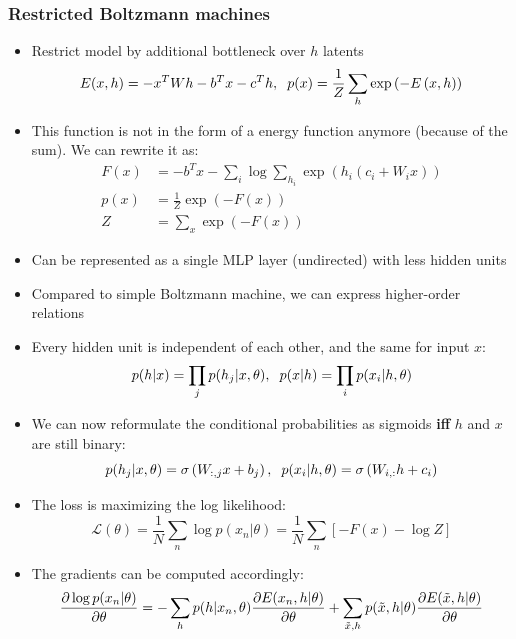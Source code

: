 \subsubsection{Restricted Boltzmann machines}
\begin{itemize}
	\item Restrict model by additional bottleneck over $h$ latents
	$$E(x,h) = -x^T W h - b^T x - c^T h, \hspace{2mm} p(x) = \frac{1}{Z}\sum_h \exp\left(-E\left(x,h\right)\right)$$
	\item This function is not in the form of a energy function anymore (because of the sum). We can rewrite it as:
	\begin{equation*}
		\begin{split}
			F(x) & = -b^T x - \sum_i \log \sum_{h_i} \exp\left(h_i\left(c_i + W_i x\right)\right)\\
			p(x) & = \frac{1}{Z} \exp\left(-F(x)\right)\\
			Z & = \sum\limits_x \exp\left(-F(x)\right)
		\end{split}
	\end{equation*}
	\item Can be represented as a single MLP layer (undirected) with less hidden units
	\item Compared to simple Boltzmann machine, we can express higher-order relations 
	\item Every hidden unit is independent of each other, and the same for input $x$:
	$$p(h|x) = \prod_j p(h_j|x, \theta), \hspace{2mm} p(x|h) = \prod_i p(x_i|h, \theta) $$
	\item We can now reformulate the conditional probabilities as sigmoids \textbf{iff} $h$ and $x$ are still binary:
	$$p(h_j|x, \theta) = \sigma\left(W_{:,j} x + b_j\right), \hspace{2mm}p(x_i|h, \theta) = \sigma\left(W_{i,:} h + c_i\right)$$
	\item The loss is maximizing the log likelihood:
	$$\mathcal{L}(\theta) = \frac{1}{N}\sum_n \log p(x_n|\theta) = \frac{1}{N}\sum_n\left[- F(x) - \log Z\right]$$
	\item The gradients can be computed accordingly:
	\begin{equation*}
		\begin{split}
			\pd{\log p(x_n|\theta)}{\theta} & = -\sum_h p(h|x_n, \theta) \pd{E(x_n,h| \theta)}{\theta} + \sum_{\tilde{x}, h} p(\tilde{x}, h|\theta) \pd{E(\tilde{x}, h|\theta)}{\theta}\\

\end{split}
\end{equation*}
\end{itemize}
